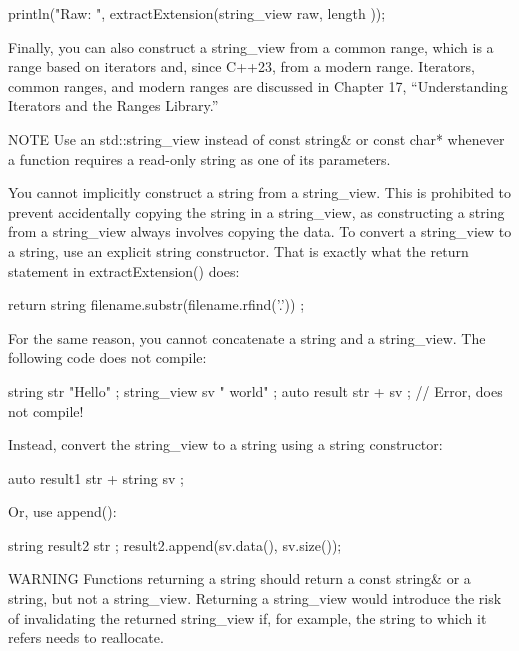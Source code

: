 \begin{cpp}
println("Raw: {}", extractExtension(string_view { raw, length }));
\end{cpp}

Finally, you can also construct a string\_view from a common range, which is a range based on iterators and, since C++23, from a modern range. Iterators, common ranges, and modern ranges are discussed in Chapter 17, “Understanding Iterators and the Ranges Library.”

\begin{myNotic}{NOTE}
Use an std::string\_view instead of const string\& or const char* whenever a function requires a read-only string as one of its parameters.
\end{myNotic}

You cannot implicitly construct a string from a string\_view. This is prohibited to prevent accidentally copying the string in a string\_view, as constructing a string from a string\_view always involves copying the data. To convert a string\_view to a string, use an explicit string constructor. That is exactly what the return statement in extractExtension() does:

\begin{cpp}
return string { filename.substr(filename.rfind('.')) };
\end{cpp}

For the same reason, you cannot concatenate a string and a string\_view. The following code does not compile:

\begin{cpp}
string str { "Hello" };
string_view sv { " world" };
auto result { str + sv }; // Error, does not compile!
\end{cpp}

Instead, convert the string\_view to a string using a string constructor:

\begin{cpp}
auto result1 { str + string { sv } };
\end{cpp}

Or, use append():

\begin{cpp}
string result2 { str };
result2.append(sv.data(), sv.size());
\end{cpp}

\begin{myWarning}{WARNING}
Functions returning a string should return a const string\& or a string, but not a string\_view. Returning a string\_view would introduce the risk of invalidating the returned string\_view if, for example, the string to which it refers needs to reallocate.
\end{myWarning}

